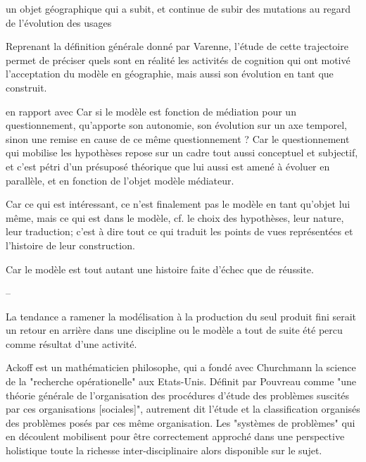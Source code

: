 {un objet géographique qui a subit, et continue de subir des mutations au regard de l'évolution des usages 


Reprenant la définition générale donné par Varenne, l'étude de cette trajectoire permet de préciser quels sont en réalité les activités de cognition qui ont motivé l'acceptation du modèle en géographie, mais aussi son évolution en tant que construit. 

en rapport avec Car si le modèle est fonction de médiation pour un questionnement, qu'apporte son autonomie, son évolution sur un axe temporel, sinon une remise en cause de ce même questionnement ? Car le questionnement qui mobilise les hypothèses repose sur un cadre tout aussi conceptuel et subjectif, et c'est pétri d'un présuposé théorique que lui aussi est amené à évoluer en parallèle, et en fonction de l'objet modèle médiateur.


Car ce qui est intéressant, ce n'est finalement pas le modèle en tant qu'objet lui même, mais ce qui est dans le modèle, cf. le choix des hypothèses, leur nature, leur traduction; c'est à dire tout ce qui traduit les points de vues représentées et l'histoire de leur construction.

Car le modèle est tout autant une histoire faite d'échec que de réussite.

--

La tendance a ramener la modélisation à la production du seul produit fini serait un retour en arrière dans une discipline ou le modèle a tout de suite été percu comme résultat d'une activité.





Ackoff est un mathématicien philosophe, qui a fondé avec Churchmann la science de la "recherche opérationelle" aux Etats-Unis. Définit par Pouvreau \autocite{Pouvreau2013} comme  "une théorie générale de l’organisation des procédures d’étude des problèmes suscités par ces organisations [sociales]", autrement dit l'étude et la classification organisés des problèmes posés par ces même organisation. Les "systèmes de problèmes" qui en découlent mobilisent pour être correctement approché dans une perspective holistique toute la richesse inter-disciplinaire alors disponible sur le sujet. 

}
